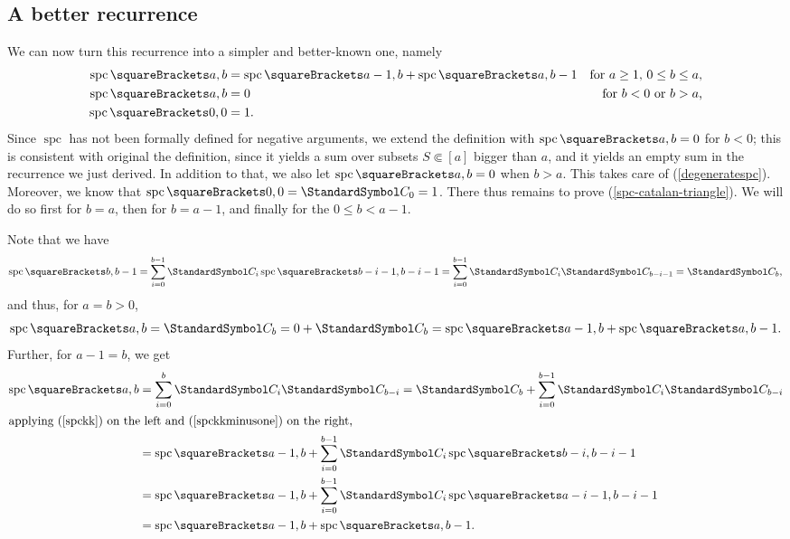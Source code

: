 \documentclass[10pt, a4paper, twoside]{basestyle}
\DeclareMathOperator{\spc}{spc}
\newcommand{\CatalanNumber}[1]{\StandardSymbol C_{#1}}
\begin{document}
\subsection{A better recurrence}
We can now turn this recurrence into a simpler and better-known one, namely
\begin{align}
\spc\of{a,b} &= \spc\of{a-1, b} + \spc\of{a,b-1} & \text{for $a\geq 1$, $0\leq b \leq a$,}\label{spc-catalan-triangle}\\
\spc\of{a,b} &= 0 & \text{for $b < 0$ or $b > a$,}\label{degeneratespc}\\
\spc\of{0,0} &= 1 \label{spc00}\text.
\end{align}
Since $\spc$ has not been formally defined for negative arguments, we extend the definition
with $\spc\of{a,b}=0$ for $b<0$; this is consistent with original the definition, since it yields a sum over
subsets $S\Subset [a]$ bigger than $a$, and it yields an empty sum in the recurrence we just derived.
In addition to that, we also let $\spc\of{a,b} = 0$ when $b > a$. This takes care of (\ref{degeneratespc}).
Moreover, we know that $\spc\of{0,0}=\CatalanNumber 0=1$. There thus remains to prove (\ref{spc-catalan-triangle}).
We will do so first for $b=a$, then for $b=a-1$, and finally for the $0\leq b < a-1$.

Note that we have\begin{align}
\spc\of{b, b-1}
= \sum{i=0}[b-1]\CatalanNumber {i}\spc\of{b-i-1,b-i-1} 
= \sum{i=0}[b-1]\CatalanNumber {i}\CatalanNumber {b-i-1}
= \CatalanNumber {b}\text,\label{spckkminusone}
\end{align}
and thus, for $a=b > 0$,
\begin{equation}
\spc\of{a,b} = \CatalanNumber b = 0 + \CatalanNumber b = \spc\of{a-1, b} + \spc\of{a, b-1}.
\end{equation}
Further, for $a - 1 = b$, we get
\begin{align}
\spc\of{a,b}
&= \sum{i=0}[b]\CatalanNumber {i}\CatalanNumber {b-i} =
\CatalanNumber b + \sum{i=0}[b-1]\CatalanNumber{i}\CatalanNumber {b-i} \nonumber\\
\intertext{applying (\ref{spckk}) on the left and (\ref{spckkminusone}) on the right,}
&= \spc\of{a-1, b} + \sum{i=0}[b-1]\CatalanNumber {i}\spc\of{b-i,b-i-1} \nonumber\\
&= \spc\of{a-1, b} + \sum{i=0}[b-1]\CatalanNumber {i}\spc\of{a-i-1,b-i-1} \nonumber\\
&= \spc\of{a-1, b} + \spc\of{a,b-1}\text.
\end{align}
\end{document}
